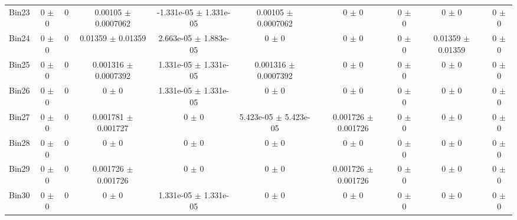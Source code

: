 \begin{tabular}{@{\extracolsep{4pt}}lccccccccc@{}}
     Bin23 & 0 $\pm$ 0 & 0 & 0.00105 $\pm$ 0.0007062 & -1.331e-05 $\pm$ 1.331e-05 & 0.00105 $\pm$ 0.0007062 & 0 $\pm$ 0 & 0 $\pm$ 0 & 0 $\pm$ 0 & 0 $\pm$ 0 \\ 
     Bin24 & 0 $\pm$ 0 & 0 & 0.01359 $\pm$ 0.01359 & 2.663e-05 $\pm$ 1.883e-05 & 0 $\pm$ 0 & 0 $\pm$ 0 & 0 $\pm$ 0 & 0.01359 $\pm$ 0.01359 & 0 $\pm$ 0 \\ 
     Bin25 & 0 $\pm$ 0 & 0 & 0.001316 $\pm$ 0.0007392 & 1.331e-05 $\pm$ 1.331e-05 & 0.001316 $\pm$ 0.0007392 & 0 $\pm$ 0 & 0 $\pm$ 0 & 0 $\pm$ 0 & 0 $\pm$ 0 \\ 
     Bin26 & 0 $\pm$ 0 & 0 & 0 $\pm$ 0 & 1.331e-05 $\pm$ 1.331e-05 & 0 $\pm$ 0 & 0 $\pm$ 0 & 0 $\pm$ 0 & 0 $\pm$ 0 & 0 $\pm$ 0 \\ 
     Bin27 & 0 $\pm$ 0 & 0 & 0.001781 $\pm$ 0.001727 & 0 $\pm$ 0 & 5.423e-05 $\pm$ 5.423e-05 & 0.001726 $\pm$ 0.001726 & 0 $\pm$ 0 & 0 $\pm$ 0 & 0 $\pm$ 0 \\ 
     Bin28 & 0 $\pm$ 0 & 0 & 0 $\pm$ 0 & 0 $\pm$ 0 & 0 $\pm$ 0 & 0 $\pm$ 0 & 0 $\pm$ 0 & 0 $\pm$ 0 & 0 $\pm$ 0 \\ 
     Bin29 & 0 $\pm$ 0 & 0 & 0.001726 $\pm$ 0.001726 & 0 $\pm$ 0 & 0 $\pm$ 0 & 0.001726 $\pm$ 0.001726 & 0 $\pm$ 0 & 0 $\pm$ 0 & 0 $\pm$ 0 \\ 
     Bin30 & 0 $\pm$ 0 & 0 & 0 $\pm$ 0 & 1.331e-05 $\pm$ 1.331e-05 & 0 $\pm$ 0 & 0 $\pm$ 0 & 0 $\pm$ 0 & 0 $\pm$ 0 & 0 $\pm$ 0 \\ 
\hline\hline
  \end{tabular}
